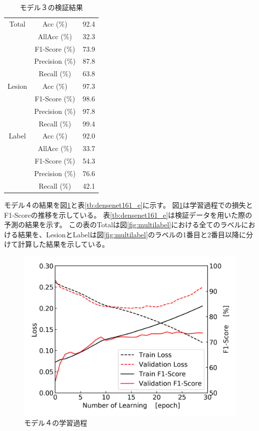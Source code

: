 \begin{table}[tb]
    \caption[]{モデル３の検証結果}
    \label{tb:densenet161}
    \centering
    \normalsize
    \begin{tabular}{c|c|r} \hline
        Total & Acc (\%) & 92.4 \\ \cline{2-3}
         & AllAcc (\%) & 32.3 \\ \cline{2-3}
         & F1-Score (\%) & 73.9 \\ \cline{2-3}
         & Precision (\%) & 87.8 \\ \cline{2-3}
         & Recall (\%) & 63.8 \\ \hline
        Lesion & Acc (\%) & 97.3 \\ \cline{2-3}
         & F1-Score (\%) & 98.6 \\ \cline{2-3}
         & Precision (\%) & 97.8 \\ \cline{2-3}
         & Recall (\%) & 99.4 \\ \hline
        Label & Acc (\%) & 92.0 \\ \cline{2-3}
         & AllAcc (\%) & 33.7 \\ \cline{2-3}
         & F1-Score (\%) & 54.3 \\ \cline{2-3}
         & Precision (\%) & 76.6 \\ \cline{2-3}
         & Recall (\%) & 42.1 \\ \hline
    \end{tabular}
\end{table}

\newpage
モデル４の結果を図\ref{fig:densenet161_e_result_process}と表\ref{tb:densenet161_e}に示す。
図\ref{fig:densenet161_e_result_process}は学習過程での損失とF1-Scoreの推移を示している。
表\ref{tb:densenet161_e}は検証データを用いた際の予測の結果を示す。
この表のTotalは図\ref{fig:multilabel}における全てのラベルにおける結果を、LesionとLabelは図\ref{fig:multilabel}のラベルの1番目と2番目以降に分けて計算した結果を示している。

\begin{figure}[htbp]
    \begin{center}
        \includegraphics[width=150mm]{./fig/densenet161_eprocess.png}
        \caption{モデル４の学習過程}
        \label{fig:densenet161_e_result_process}
    \end{center}
\end{figure}

